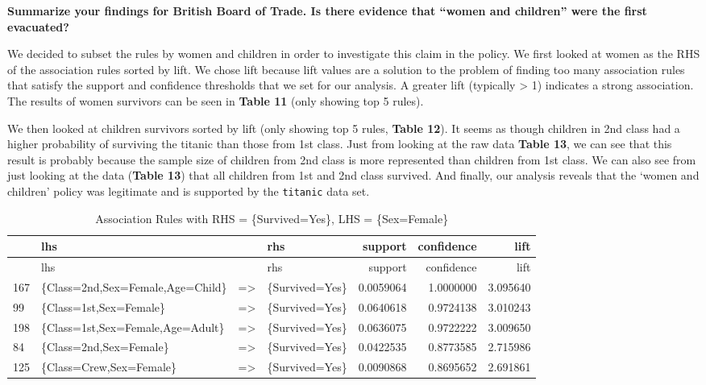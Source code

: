 \documentclass[]{article}
\begin{document}
\textbf{Summarize your findings for British Board of Trade. Is there
evidence that ``women and children'' were the first evacuated?}

We decided to subset the rules by women and children in order to
investigate this claim in the policy. We first looked at women as the
RHS of the association rules sorted by lift. We chose lift because lift
values are a solution to the problem of finding too many association
rules that satisfy the support and confidence thresholds that we set for
our analysis. A greater lift (typically \textgreater{} 1) indicates a
strong association. The results of women survivors can be seen in
\textbf{Table 11} (only showing top 5 rules).

We then looked at children survivors sorted by lift (only showing top 5
rules, \textbf{Table 12}). It seems as though children in 2nd class had
a higher probability of surviving the titanic than those from 1st class.
Just from looking at the raw data \textbf{Table 13}, we can see that
this result is probably because the sample size of children from 2nd
class is more represented than children from 1st class. We can also see
from just looking at the data (\textbf{Table 13}) that all children from
1st and 2nd class survived. And finally, our analysis reveals that the
`women and children' policy was legitimate and is supported by the
\texttt{titanic} data set.

\begin{longtable}[c]{@{}llllrrr@{}}
\caption{Association Rules with RHS = \{Survived=Yes\}, LHS =
\{Sex=Female\}}\tabularnewline
\toprule
& lhs & & rhs & support & confidence & lift\tabularnewline
\midrule
\endfirsthead
\toprule
& lhs & & rhs & support & confidence & lift\tabularnewline
\midrule
\endhead
167 & \{Class=2nd,Sex=Female,Age=Child\} & =\textgreater{} &
\{Survived=Yes\} & 0.0059064 & 1.0000000 & 3.095640\tabularnewline
99 & \{Class=1st,Sex=Female\} & =\textgreater{} & \{Survived=Yes\} &
0.0640618 & 0.9724138 & 3.010243\tabularnewline
198 & \{Class=1st,Sex=Female,Age=Adult\} & =\textgreater{} &
\{Survived=Yes\} & 0.0636075 & 0.9722222 & 3.009650\tabularnewline
84 & \{Class=2nd,Sex=Female\} & =\textgreater{} & \{Survived=Yes\} &
0.0422535 & 0.8773585 & 2.715986\tabularnewline
125 & \{Class=Crew,Sex=Female\} & =\textgreater{} & \{Survived=Yes\} &
0.0090868 & 0.8695652 & 2.691861\tabularnewline
\bottomrule
\end{longtable}
\end{document}
